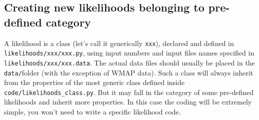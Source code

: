 \documentclass[10pt]{article}
\begin{document}
\subsection{Creating new likelihoods belonging to pre-defined category}

A likelihood is a class (let's call it generically \verb?xxx?), declared and
defined in \verb?likelihoods/xxx/xxx.py?, using input numbers and input files
names specified in \verb?likelihoods/xxx/xxx.data?. The actual data files
should usually be placed in the \verb?data/?folder (with the exception of WMAP
data). Such a class will always inherit from the properties of the most generic
class defined inside \verb?code/likelihoods_class.py?. But it may fall in the
category of some pre-defined likelihoods and inherit more properties. In this
case the coding will be extremely simple, you won't need to write a specific
likelihood code.
\end{document}
